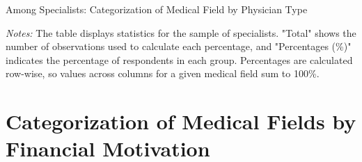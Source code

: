 \documentclass[11pt]{article}
\theoremstyle{definition}
\begin{document}
\begin{table}[H]
    \centering
    \caption{Among Specialists: Categorization of Medical Field by Physician Type}
    \begin{adjustbox}{width=0.95\linewidth} 
    
    \end{adjustbox}
    \label{tab:med_field_cat_phystype_sp}
          {\parbox{1\linewidth}{           %
    		\scriptsize{{{ \textit{Notes:} The table displays statistics for the sample of specialists. "Total" shows the number of observations used to calculate each percentage, and "Percentages (\%)" indicates the percentage of respondents in each group. Percentages are calculated row-wise, so values across columns for a given medical field sum to 100\%.}}}}}
\end{table}


\section{Categorization of Medical Fields by Financial Motivation} 
\end{document}
